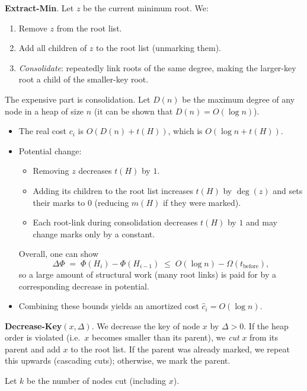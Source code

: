 \documentclass[9pt]{extarticle}
\begin{document}
\textbf{Extract-Min}.  
Let $z$ be the current minimum root.
We:
\begin{enumerate}
  \item Remove $z$ from the root list.
  \item Add all children of $z$ to the root list (unmarking them).
  \item \emph{Consolidate}: repeatedly link roots of the same degree,
        making the larger-key root a child of the smaller-key root.
\end{enumerate}

The expensive part is consolidation. Let $D(n)$ be the maximum degree of any node in a heap of size $n$ (it can be shown that $D(n)=O(\log n)$).

\begin{itemize}
  \item The real cost $c_i$ is $O(D(n) + t(H))$, which is $O(\log n + t(H))$.
  \item Potential change:
    \begin{itemize}
      \item Removing $z$ decreases $t(H)$ by $1$.
      \item Adding its children to the root list increases $t(H)$ by $\deg(z)$
            and sets their marks to $0$ (reducing $m(H)$ if they were marked).
      \item Each root-link during consolidation decreases $t(H)$ by $1$
            and may change marks only by a constant.
    \end{itemize}
    Overall, one can show
    \[
      \Delta \Phi \;=\; \Phi(H_i) - \Phi(H_{i-1}) \;\le\; O(\log n) - \Omega(t_{\text{before}}),
    \]
    so a large amount of structural work (many root links) is paid for by a
    corresponding decrease in potential.
  \item Combining these bounds yields an amortized cost $\hat c_i = O(\log n)$.
\end{itemize}

\textbf{Decrease-Key$(x,\Delta)$}.  
We decrease the key of node $x$ by $\Delta>0$.
If the heap order is violated (i.e.\ $x$ becomes smaller than its parent),
we \emph{cut} $x$ from its parent and add $x$ to the root list.
If the parent was already marked, we repeat this upwards (cascading cuts);
otherwise, we mark the parent.

Let $k$ be the number of nodes cut (including $x$).
\end{document}

